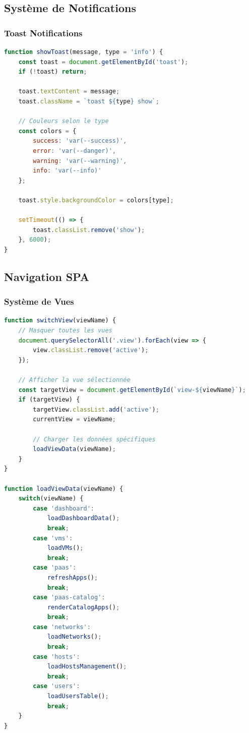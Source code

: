 \documentclass[12pt,a4paper]{article}
\begin{document}
\subsection{Système de Notifications}

\subsubsection{Toast Notifications}

\begin{lstlisting}[language=JavaScript,caption=Notifications (navigation.js)]
function showToast(message, type = 'info') {
    const toast = document.getElementById('toast');
    if (!toast) return;
    
    toast.textContent = message;
    toast.className = `toast ${type} show`;
    
    // Couleurs selon le type
    const colors = {
        success: 'var(--success)',
        error: 'var(--danger)',
        warning: 'var(--warning)',
        info: 'var(--info)'
    };
    
    toast.style.backgroundColor = colors[type];
    
    setTimeout(() => {
        toast.classList.remove('show');
    }, 6000);
}
\end{lstlisting}

\subsection{Navigation SPA}

\subsubsection{Système de Vues}

\begin{lstlisting}[language=JavaScript,caption=Navigation (navigation.js)]
function switchView(viewName) {
    // Masquer toutes les vues
    document.querySelectorAll('.view').forEach(view => {
        view.classList.remove('active');
    });
    
    // Afficher la vue sélectionnée
    const targetView = document.getElementById(`view-${viewName}`);
    if (targetView) {
        targetView.classList.add('active');
        currentView = viewName;
        
        // Charger les données spécifiques
        loadViewData(viewName);
    }
}

function loadViewData(viewName) {
    switch(viewName) {
        case 'dashboard':
            loadDashboardData();
            break;
        case 'vms':
            loadVMs();
            break;
        case 'paas':
            refreshApps();
            break;
        case 'paas-catalog':
            renderCatalogApps();
            break;
        case 'networks':
            loadNetworks();
            break;
        case 'hosts':
            loadHostsManagement();
            break;
        case 'users':
            loadUsersTable();
            break;
    }
}
\end{lstlisting}
\end{document}
